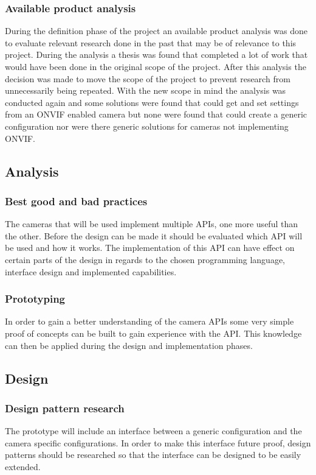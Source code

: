 \documentclass[11pt, a4paper]{article}
\begin{document}
\subsubsection{Available product analysis}
During the definition phase of the project an available product analysis was done to evaluate relevant research done in the past that may be of relevance to this
project. During the analysis a thesis \cite{tim_k_onvif} was found that completed a lot of work that would have been done in the original scope of the project. After
this analysis the decision was made to move the scope of the project to prevent research from unnecessarily being repeated. With the new scope in mind the analysis was
conducted again and some solutions were found that could get and set settings from an ONVIF enabled camera but none were found that could create a generic configuration nor
were there generic solutions for cameras not implementing ONVIF.

\subsection{Analysis}
\subsubsection{Best good and bad practices}
The cameras that will be used implement multiple APIs, one more useful than the other. Before the design can be made it should be evaluated which API will be used and
how it works. The implementation of this API can have effect on certain parts of the design in regards to the chosen programming language, interface design and
implemented capabilities.

\subsubsection{Prototyping}
In order to gain a better understanding of the camera APIs some very simple proof of concepts can be built to gain experience with the API. This knowledge can then be applied during the design and implementation phases.

\subsection{Design}
\subsubsection{Design pattern research}
The prototype will include an interface between a generic configuration and the camera specific configurations. In order to make this interface future proof, design patterns should be researched so that the interface can be designed to be easily extended.
\end{document}
